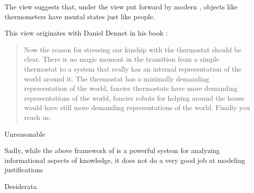 \begin{itemizedot}
  \item The view suggests that, under the view put forward by modern
  , objects like thermometers have mental states just like
  people.
  
  \item This view originates with Daniel Dennet in his book :
  
  \begin{quote}
    
    
    
    Now the reason for stressing our kinship with the thermostat should be
    clear. There is no magic moment in the transition from a simple thermostat
    to a system that really has an internal representation of the world around
    it. The thermostat has a minimally demanding representation of the world,
    fancier thermostats have more demanding representations of the world,
    fancier robots for helping around the house would have still more
    demanding representations of the world. Finally you reach us.
  \end{quote}
\end{itemizedot}
Unreasonable
\begin{itemizedot}
  \item Sadly, while the above framework of  is a powerful system
  for analyzing informational aspects of knowledge, it does not do a very good
  job at modeling justifications
  
  \item {}
\end{itemizedot}
Desiderata
